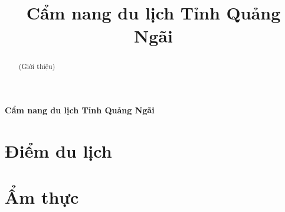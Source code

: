 \documentclass{article}
\title{Cẩm nang du lịch Tỉnh Quảng Ngãi}
\begin{document}
\begin{center}
    \fontsize{18}{20}\textbf{Cẩm nang du lịch Tỉnh Quảng Ngãi}
\end{center}
\begin{abstract}
    (Giới thiệu)
\end{abstract}
\section*{Điểm du lịch}
\newpage
\section*{{Ẩm thực}}
\end{document}
